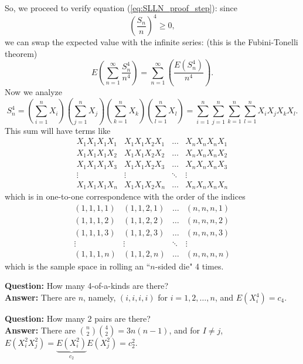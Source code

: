 \documentclass[12pt]{article}
\begin{document}
\noindent So, we proceed to verify equation (\ref{eq:SLLN_proof_step}): since
$$
\left( \frac{S_n}{n} \right)^4 \geq 0,
$$
we can swap the expected value with the infinite series: (this is the Fubini-Tonelli theorem)
$$
E\left( \sum_{n=1}^{\infty} \frac{S_n^4}{n^4} \right) = \sum_{n=1}^{\infty} \left( \frac{E\left(S_n^4\right)}{n^4} \right).
$$
Now we analyze
$$
S_n^4 = \left(\sum_{i=1}^n X_i\right)\left(\sum_{j=1}^n X_j\right)\left(\sum_{k=1}^n X_k\right)\left(\sum_{l=1}^n X_l\right) = \sum_{i=1}^n \sum_{j=1}^n \sum_{k=1}^n \sum_{l=1}^n X_i X_j X_k X_l.
$$
This sum will have terms like
$$
\begin{array}{cccc}
    X_1 X_1 X_1 X_1 & X_1 X_1 X_2 X_1 & \dots & X_n X_n X_n X_1 \\
    X_1 X_1 X_1 X_2 & X_1 X_1 X_2 X_2 & \dots & X_n X_n X_n X_2 \\
    X_1 X_1 X_1 X_3 & X_1 X_1 X_2 X_3 & \dots & X_n X_n X_n X_3 \\
    \vdots & \vdots & \ddots & \vdots \\
    X_1 X_1 X_1 X_n & X_1 X_1 X_2 X_n & \dots & X_n X_n X_n X_n
\end{array}
$$
which is in one-to-one correspondence with the order of the indices
$$
\begin{array}{cccc}
    (1, 1, 1, 1) & (1, 1, 2, 1) & \dots & (n, n, n, 1) \\
    (1, 1, 1, 2) & (1, 1, 2, 2) & \dots & (n, n, n, 2) \\
    (1, 1, 1, 3) & (1, 1, 2, 3) & \dots & (n, n, n, 3) \\
    \vdots & \vdots & \ddots & \vdots \\
    (1, 1, 1, n) & (1, 1, 2, n) & \dots & (n, n, n, n)
\end{array}
$$
which is the sample space in rolling an ``$n$-sided die" 4 times. \\

\vspace{0.25cm}

\noindent \textbf{Question: } How many 4-of-a-kinds are there? \\
\textbf{Answer:} There are $n$, namely, $(i,i,i,i)$ for $i=1,2,\dots,n$, and $E(X_i^4) = c_4$. \\

\vspace{0.25cm}

\noindent \textbf{Question: } How many 2 pairs are there? \\
\textbf{Answer:} There are ${n\choose 2}{4\choose 2}=3n(n-1)$, and for $I\ne j$,
$E(X_i^2 X_j^2) = \underbrace{E(X_i^2)}_{c_2} E(X_j^2) = c_2^2. $\\
\end{document}

